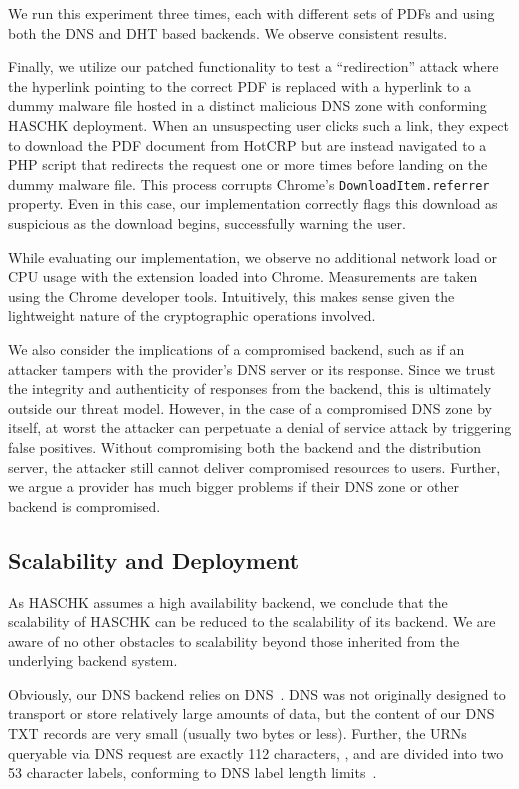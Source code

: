 We run this experiment three times, each with different sets of PDFs and using
both the DNS and DHT based backends. We observe consistent results.

Finally, we utilize our patched functionality to test a ``redirection'' attack
where the hyperlink pointing to the correct PDF is replaced with a hyperlink to
a dummy malware file hosted in a distinct malicious DNS zone with conforming
HASCHK deployment. When an unsuspecting user clicks such a link, they expect
to download the PDF document from HotCRP but are instead navigated to a PHP
script that redirects the request one or more times before landing on the dummy
malware file. This process corrupts Chrome's \texttt{DownloadItem.referrer}
property. Even in this case, our implementation correctly flags this download as
suspicious as the download begins, successfully warning the user.

While evaluating our implementation, we observe no additional network load or
CPU usage with the extension loaded into Chrome. Measurements are taken using
the Chrome developer tools. Intuitively, this makes sense given the lightweight
nature of the cryptographic operations involved.

We also consider the implications of a compromised backend, such as if an
attacker tampers with the provider's DNS server or its response. Since we trust
the integrity and authenticity of responses from the backend, this is ultimately
outside our threat model. However, in the case of a compromised DNS zone by
itself, at worst the attacker can perpetuate a denial of service attack by
triggering false positives. Without compromising both the backend and the
distribution server, the attacker still cannot deliver compromised resources to
users. Further, we argue a provider has much bigger problems if their DNS zone
or other backend is compromised.

\subsection{Scalability and Deployment}

As HASCHK assumes a high availability backend, we conclude that the
scalability of HASCHK can be reduced to the scalability of its backend. We
are aware of no other obstacles to scalability beyond those inherited from the
underlying backend system.

Obviously, our DNS backend relies on DNS~\cite{DNS1}. DNS was not originally
designed to transport or store relatively large amounts of data, but the content
of our DNS TXT records are very small (usually two bytes or less). Further, the
URNs queryable via DNS request are exactly 112 characters, , and are divided into two 53 character labels, conforming to
DNS label length limits~\cite{DNS2}.

